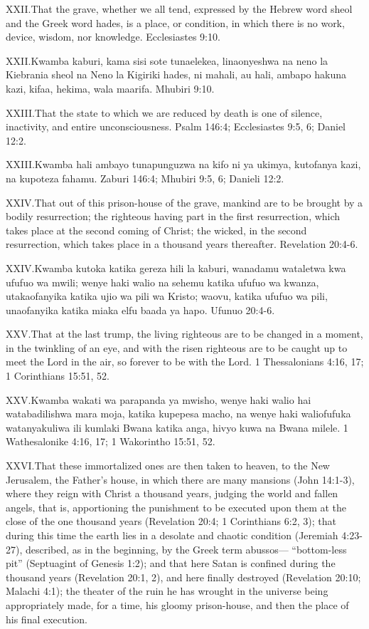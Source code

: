 \lettrine{XXII.} That the grave, whether we all tend, expressed by the Hebrew word sheol and the Greek word hades, is a place, or condition, in which there is no work, device, wisdom, nor knowledge. Ecclesiastes 9:10.


\lettrine{XXII.} Kwamba kaburi, kama sisi sote tunaelekea, linaonyeshwa na neno la Kiebrania sheol na Neno la Kigiriki hades, ni mahali, au hali, ambapo hakuna kazi, kifaa, hekima, wala maarifa. Mhubiri 9:10.


\lettrine{XXIII.} That the state to which we are reduced by death is one of silence, inactivity, and entire unconsciousness. Psalm 146:4; Ecclesiastes 9:5, 6; Daniel 12:2.


\lettrine{XXIII.} Kwamba hali ambayo tunapunguzwa na kifo ni ya ukimya, kutofanya kazi, na kupoteza fahamu. Zaburi 146:4; Mhubiri 9:5, 6; Danieli 12:2.


\lettrine{XXIV.} That out of this prison-house of the grave, mankind are to be brought by a bodily resurrection; the righteous having part in the first resurrection, which takes place at the second coming of Christ; the wicked, in the second resurrection, which takes place in a thousand years thereafter. Revelation 20:4-6.


\lettrine{XXIV.} Kwamba kutoka katika gereza hili la kaburi, wanadamu wataletwa kwa ufufuo wa mwili; wenye haki walio na sehemu katika ufufuo wa kwanza, utakaofanyika katika ujio wa pili wa Kristo; waovu, katika ufufuo wa pili, unaofanyika katika miaka elfu baada ya hapo. Ufunuo 20:4-6.


\lettrine{XXV.} That at the last trump, the living righteous are to be changed in a moment, in the twinkling of an eye, and with the risen righteous are to be caught up to meet the Lord in the air, so forever to be with the Lord. 1 Thessalonians 4:16, 17; 1 Corinthians 15:51, 52.


\lettrine{XXV.} Kwamba wakati wa parapanda ya mwisho, wenye haki walio hai watabadilishwa mara moja, katika kupepesa macho, na wenye haki waliofufuka watanyakuliwa ili kumlaki Bwana katika anga, hivyo kuwa na Bwana milele. 1 Wathesalonike 4:16, 17; 1 Wakorintho 15:51, 52.


\lettrine{XXVI.} That these immortalized ones are then taken to heaven, to the New Jerusalem, the Father’s house, in which there are many mansions (John 14:1-3), where they reign with Christ a thousand years, judging the world and fallen angels, that is, apportioning the punishment to be executed upon them at the close of the one thousand years (Revelation 20:4; 1 Corinthians 6:2, 3); that during this time the earth lies in a desolate and chaotic condition (Jeremiah 4:23-27), described, as in the beginning, by the Greek term abussos— “bottom-less pit” (Septuagint of Genesis 1:2); and that here Satan is confined during the thousand years (Revelation 20:1, 2), and here finally destroyed (Revelation 20:10; Malachi 4:1); the theater of the ruin he has wrought in the universe being appropriately made, for a time, his gloomy prison-house, and then the place of his final execution.


